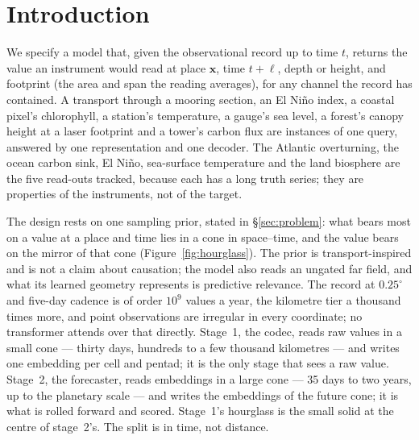 \documentclass[10pt]{article}
\begin{document}
\section{Introduction}\label{sec:intro}

We specify a model that, given the observational record up to time $t$,
returns the value an instrument would read at place $\mathbf{x}$, time $t+\ell$,
depth or height, and footprint (the area and span the reading averages), for
any channel the record has contained. A transport through a mooring section,
an El Ni\~no index, a coastal pixel's chlorophyll, a station's temperature,
a gauge's sea level, a forest's canopy height at a laser footprint and a
tower's carbon flux are instances of one query, answered by one
representation and one decoder. The Atlantic overturning, the ocean carbon
sink, El Ni\~no, sea-surface temperature and the land biosphere are the five
read-outs tracked, because each has a long truth series; they are properties
of the instruments, not of the target.

The design rests on one sampling prior, stated in \S\ref{sec:problem}: what
bears most on a value at a place and time lies in a cone in space--time, and
the value bears on the mirror of that cone (Figure~\ref{fig:hourglass}). The
prior is transport-inspired and is not a claim about causation; the model
also reads an ungated far field, and what its learned geometry represents is
predictive relevance. The record at
$0.25^\circ$ and five-day cadence is of order $10^9$ values a year, the kilometre tier a thousand times
more, and point observations are irregular in every coordinate; no
transformer attends over that directly. Stage~1, the codec, reads raw values
in a small cone --- thirty days, hundreds to a few thousand kilometres ---
and writes one embedding per cell and pentad; it is the only stage that sees
a raw value. Stage~2, the forecaster, reads embeddings in a large cone ---
35 days to two years, up to the planetary scale --- and writes the
embeddings of the future cone; it is what is rolled forward and scored.
Stage~1's hourglass is the small solid at the centre of stage~2's. The split
is in time, not distance.
\end{document}
